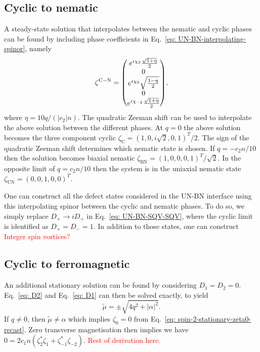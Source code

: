 \subsection{Cyclic to nematic}
A steady-state solution that interpolates between the nematic and cyclic phases
can be found by including phase coefficients in
Eq.~\eqref{eq: UN-BN-interpolating-spinor}, namely
\begin{equation}\label{eq: C-N-interpolating-spinor}
    \zeta^\mathrm{C-N} = \mqty(
    e^{i\chi_2}\frac{\sqrt{1 + \eta}}{2} \\
    0 \\
    e^{i\chi_0}\sqrt{\frac{1 - \eta}{2}} \\
    0 \\
    e^{i\chi_{-2}}\frac{\sqrt{1 + \eta}}{2}),
\end{equation}
where \(\eta = 10q/(|c_2|n)\).
The quadratic Zeeman shift can be used to interpolate the above solution between
the different phases.
At \(q = 0\) the above solution becomes the three component cyclic
\(\zeta_\mathrm{C} = {(1, 0, i\sqrt{2}, 0, 1)}^T/2\).
The sign of the quadratic Zeeman shift determines which nematic state is chosen.
If \(q = -c_2n/10\) then the solution becomes biaxial nematic
\(\zeta_\mathrm{BN} = {(1, 0, 0, 0, 1)}^T/\sqrt{2}\).
In the opposite limit of \(q = c_2n/10\) then the system is in the uniaxial
nematic state \(\zeta_\mathrm{UN} = {(0, 0, 1, 0, 0)}^T\).

One can construct all the defect states considered in the UN-BN interface
using this interpolating spinor between the cyclic and nematic phases.
To do so, we simply replace \(D_+ \rightarrow iD_+\) in
Eq.~\eqref{eq: UN-BN-SQV-SQV}, where the cyclic limit is identified as
\(D_+=D_-=1\).
In addition to those states, one can construct \textcolor{red}{Integer spin
    vortices?}

\subsection{Cyclic to ferromagnetic}
An additional stationary solution can be found by considering \(D_1=D_2=0\).
Eq.~\eqref{eq: D2} and Eq.~\eqref{eq: D1} can then be solved exactly, to yield
\begin{equation}
    \tilde{\mu} = \pm \sqrt{4q^2 + |\alpha|^2}.
\end{equation}
If \(q \neq 0\), then \(\tilde{\mu} \neq \alpha \) which implies \(\zeta_0=0\)
from Eq.~\eqref{eq: spin-2-stationary-zeta0-recast}.
Zero transverse magnetisation then implies we have
\(0 = 2c_1n(\zeta_2^*\zeta_{1} + \zeta_{-1}^*\zeta_{-2})\).
\textcolor{red}{Rest of derivation here.}

